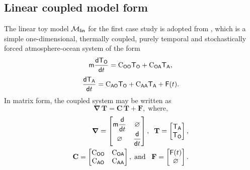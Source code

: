 \documentclass[a4paper,10pt]{article}
\begin{document}
\begin{multicols}{2}
\section{Linear coupled model form}
\label{sec:linear}
The linear toy model $\mathcal{M}_\mathsf{lin}$ for the first case study is adopted from \citet{barsugli1998}, which is a simple one-dimensional, thermally coupled, purely temporal and stochastically forced atmosphere-ocean system of the form
\begin{equation}
\mathsf{m}\frac{\mathsf{dT}_\mathsf{O}}{\mathsf{d}t} = \mathrm{C}_\mathsf{OO}\mathsf{T_O} + \mathrm{C}_\mathsf{OA}\mathsf{T_A},\label{eq:linmodel1}
\end{equation}
\begin{equation}
\frac{\mathsf{dT}_\mathsf{A}}{\mathsf{d}t} = \mathrm{C}_\mathsf{AO}\mathsf{T_O} + \mathrm{C}_\mathsf{AA}\mathsf{T_A} + \mathsf{F}(t).\label{eq:linmodel2}
\end{equation}
In matrix form, the coupled system may be written as 
\begin{equation}
\boldsymbol{\nabla}\,\mathbf{T} = \mathbf{C}\,\mathbf{T} + \mathbf{F},\;\text{where,}\label{eq:linmodelvec}
\end{equation}
\begin{equation}
\begin{aligned}[b]
\boldsymbol{\nabla} = 
\begin{bmatrix}
    \mathsf{m}\displaystyle\frac{\mathsf{d}}{\mathsf{d}t} & \varnothing \\
    \varnothing & \displaystyle\frac{\mathsf{d}}{\mathsf{d}t} 
\end{bmatrix},\;\; 
\mathbf{T} = 
\begin{bmatrix}
    \mathsf{T_A} \\
    \mathsf{T_O} 
\end{bmatrix},
\\
\mathbf{C} = 
\begin{bmatrix}
    \mathrm{C}_\mathsf{OO} & \mathrm{C}_\mathsf{OA} \\
    \mathrm{C}_\mathsf{AO} & \mathrm{C}_\mathsf{AA} 
\end{bmatrix},\;\text{and}\;\;\;
\mathbf{F} = 
\begin{bmatrix}
    \mathsf{F}(t) \\
    \varnothing 
\end{bmatrix}.
\end{aligned}
\label{eq:linmodelvals}
\end{equation}

\end{multicols}
\end{document}
